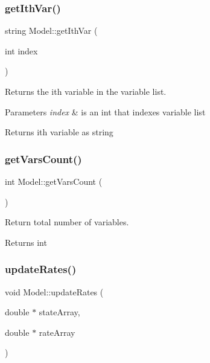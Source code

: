 \subsubsection{\texorpdfstring{get\+Ith\+Var()}{getIthVar()}}
{\footnotesize\ttfamily string Model\+::get\+Ith\+Var (\begin{DoxyParamCaption}\item[{int}]{index }\end{DoxyParamCaption})}



Returns the ith variable in the variable list. 


\begin{DoxyParams}{Parameters}
{\em index} & is an int that indexes variable list \\
\hline
\end{DoxyParams}
\begin{DoxyReturn}{Returns}
ith variable as string 
\end{DoxyReturn}
\mbox{\label{class_model_ae8b56a284c355ff18421174d078dc870}} 
\subsubsection{\texorpdfstring{get\+Vars\+Count()}{getVarsCount()}}
{\footnotesize\ttfamily int Model\+::get\+Vars\+Count (\begin{DoxyParamCaption}{ }\end{DoxyParamCaption})}



Return total number of variables. 

\begin{DoxyReturn}{Returns}
int 
\end{DoxyReturn}
\mbox{\label{class_model_a3f2fd71261c87162718864d7efc67f2f}} 
\subsubsection{\texorpdfstring{update\+Rates()}{updateRates()}}
{\footnotesize\ttfamily void Model\+::update\+Rates (\begin{DoxyParamCaption}\item[{double $\ast$}]{state\+Array,  }\item[{double $\ast$}]{rate\+Array }\end{DoxyParamCaption})}



